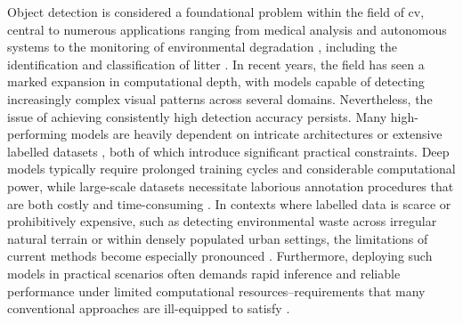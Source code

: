 

Object detection is considered a foundational problem within the field of \gls{cv}, central to numerous applications ranging from medical analysis \cite{application_med1, application_med2} and autonomous systems \cite{application_automation1, application_automation2} to the monitoring of environmental degradation \cite{application_environment1, application_environment2}, including the identification and classification of litter \cite{taco2020, zerowaste}. In recent years, the field has seen a marked expansion in computational depth, with models capable of detecting increasingly complex visual patterns across several domains. Nevertheless, the issue of achieving consistently high detection accuracy persists. Many high-performing models are heavily dependent on intricate architectures \cite{detr, rt-detr} or extensive labelled datasets \cite{od_survey_problems}, both of which introduce significant practical constraints. Deep models typically require prolonged training cycles and considerable computational power, while large-scale datasets necessitate laborious annotation procedures that are both costly and time-consuming \cite{survey_od_problem}. In contexts where labelled data is scarce or prohibitively expensive, such as detecting environmental waste across irregular natural terrain or within densely populated urban settings, the limitations of current methods become especially pronounced \cite{taco2020, soda_dataset}. Furthermore, deploying such models in practical scenarios often demands rapid inference and reliable performance under limited computational resources--requirements that many conventional approaches are ill-equipped to satisfy \cite{od_survey_problems}.

